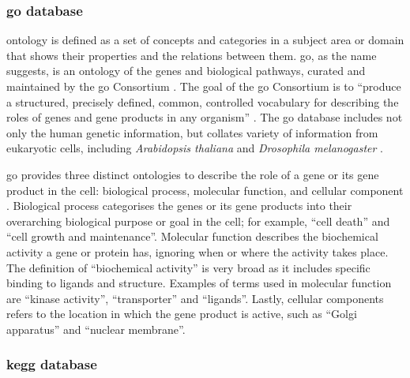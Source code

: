 \subsubsection{\gls{go} database}
\label{ssub:go_database}

\Gls{ontology} is defined as a set of concepts and categories in a subject area or domain that shows their properties and the relations between them.
\Acrfull{go}, as the name suggests, is an \gls{ontology} of the genes and biological pathways, curated and maintained by the \gls{go} Consortium \citep{GO2000,GO2004}.
The goal of the \gls{go} Consortium is to ``produce a structured, precisely defined, common, controlled vocabulary for describing the roles of genes and gene products in any organism'' \citep{GO2000}.
The \gls{go} database includes not only the human genetic information, but collates variety of information from eukaryotic cells, including \textit{Arabidopsis thaliana} and \textit{Drosophila melanogaster} \citep{GO2000,GO2004}.

\gls{go} provides three distinct ontologies to describe the role of a gene or its gene product in the cell: biological process, molecular function, and cellular component \citep{GO2000}.
Biological process categorises the genes or its gene products into their overarching biological purpose or goal in the cell; for example, ``cell death'' and ``cell growth and maintenance''.
Molecular function describes the biochemical activity a gene or protein has, ignoring when or where the activity takes place.
The definition of ``biochemical activity'' is very broad as it includes specific binding to ligands and structure.
Examples of terms used in molecular function are ``kinase activity'', ``transporter'' and ``ligands''.
Lastly, cellular components refers to the location in which the gene product is active, such as ``Golgi apparatus'' and ``nuclear membrane''.


\subsubsection{\gls{kegg} database}
\label{ssub:kegg_database}



